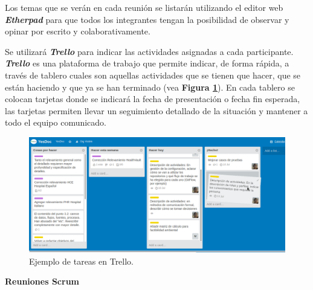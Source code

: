 Los temas que se verán en cada reunión se listarán utilizando el editor web \textbf{\textit{Etherpad}} para que todos los integrantes tengan la posibilidad de observar y opinar por escrito y colaborativamente.


Se utilizará \textbf{\textit{Trello}} para indicar las actividades asignadas a cada participante. \textbf{\textit{Trello}} es una plataforma de trabajo que permite indicar, de forma rápida, a través de tablero cuales son aquellas actividades que se tienen que hacer, que se están haciendo y que ya se han terminado (vea \textbf{Figura \ref{trello_tareas}}). En cada tablero  se colocan tarjetas donde se indicará la fecha de presentación o fecha fin esperada, las tarjetas permiten llevar un seguimiento detallado de la situación y mantener a todo el equipo comunicado.


    \begin{figure}
      \centering
      \includegraphics[width=.8\textwidth]{img/tp2_definicion/trello_tareas}
      \caption{Ejemplo de tareas en Trello.}
      \label{trello_tareas}
    \end{figure}

\textbf{Reuniones Scrum}

